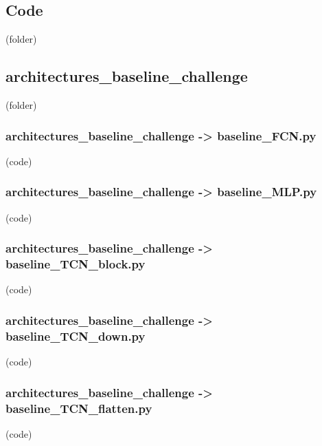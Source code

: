 \begin{myparindent}{0pt}

\noindent\section{Code} (folder)
	\noindent\subsection[architectures\_baseline\_challenge]{architectures\_baseline\_challenge} (folder)
\noindent\subsubsection[baseline\_FCN.py]{architectures\_baseline\_challenge -> baseline\_FCN.py} (code)

\noindent\subsubsection[baseline\_MLP.py]{architectures\_baseline\_challenge -> baseline\_MLP.py} (code)

\noindent\subsubsection[baseline\_TCN\_block.py]{architectures\_baseline\_challenge -> baseline\_TCN\_block.py} (code)

\noindent\subsubsection[baseline\_TCN\_down.py]{architectures\_baseline\_challenge -> baseline\_TCN\_down.py} (code)

\noindent\subsubsection[baseline\_TCN\_flatten.py]{architectures\_baseline\_challenge -> baseline\_TCN\_flatten.py} (code)


\end{myparindent}
